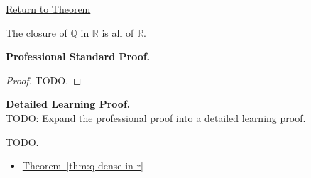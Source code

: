 \newpage
{}
\label{prf:closure-of-q-is-r}

\begin{remark*}[Return]
\hyperref[thm:closure-of-q-is-r]{Return to Theorem}
\end{remark*}

\begin{theorem*}
The closure of $\mathbb{Q}$ in $\mathbb{R}$ is all of $\mathbb{R}$.
\end{theorem*}

\textbf{Professional Standard Proof.}~\\
\begin{proof}
TODO.
\end{proof}

\textbf{Detailed Learning Proof.}~\\
TODO: Expand the professional proof into a detailed learning proof.


\begin{remark*}
TODO.
\end{remark*}

\begin{dependencies}
\begin{itemize}
  \item \hyperref[thm:q-dense-in-r]{Theorem~\ref*{thm:q-dense-in-r}}
\end{itemize}
\end{dependencies}

